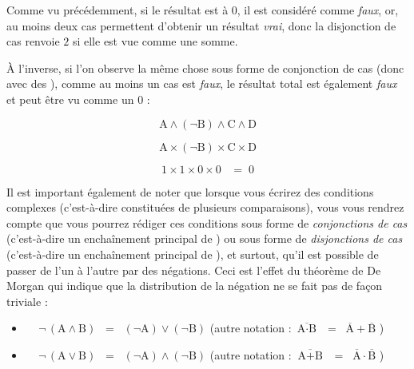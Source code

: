 \documentclass[11pt,a4paper]{article}
\begin{document}
Comme vu précédemment, si le résultat est à $ 0 $, il est considéré comme \textit{faux}, or, au moins deux cas permettent d'obtenir un résultat \textit{vrai}, donc la disjonction de cas renvoie $ 2 $ si elle est vue comme une somme.

\`A l'inverse, si l'on observe la même chose sous forme de conjonction de cas (donc avec des ), comme au moins un cas est \textit{faux}, le résultat total est également \textit{faux} et peut être vu comme un $ 0 $ :

\begin{table}[!ht]
  \centering
  \begin{minipage}{0.3\textwidth}
    \centering

\begin{equation*}
\text{A} \wedge ( \neg \text{B} ) \wedge \text{C} \wedge \text{D}
\end{equation*}

  \end{minipage}
  \hfillx
  \begin{minipage}{0.3\textwidth}
    \centering

\begin{equation*}
\text{A} \times ( \neg \text{B} ) \times \text{C} \times \text{D}
\end{equation*}

  \end{minipage}
  \hfillx
  \begin{minipage}{0.3\textwidth}
    \centering

\begin{equation*}
1 \times 1 \times 0 \times 0  \; \; \; = \; 0
\end{equation*}

  \end{minipage}
\end{table}


Il est important également de noter que lorsque vous écrirez des conditions complexes (c'est-à-dire constituées de plusieurs comparaisons), vous vous rendrez compte que vous pourrez rédiger ces conditions sous forme de \textit{conjonctions de cas} (c'est-à-dire un enchaînement principal de ) ou sous forme de \textit{disjonctions de cas} (c'est-à-dire un enchaînement principal de ), et surtout, qu'il est possible de passer de l'un à l'autre par des négations.
Ceci est l'effet du théorème de De Morgan qui indique que la distribution de la négation ne se fait pas de façon triviale :

\begin{itemize}[label=$\bullet$]
\item $ \; \; \; $  $ \neg \, ( \text{A} \wedge \text{B} ) \; \; = \; \;  ( \neg \text{A} ) \vee ( \neg \text{B} ) $  \hspace*{2cm}  (autre notation : $ \overline{\text{A} \cdot \text{B}} \; \; = \; \; \overline{\text{A}} + \overline{\text{B}} $ )
\item $ \; \; \; $  $ \neg \, ( \text{A} \vee \text{B} ) \; \; = \; \;  ( \neg \text{A} ) \wedge ( \neg \text{B} ) $  \hspace*{2cm}  (autre notation : $ \overline{\text{A} + \text{B}} \; \; = \; \; \overline{\text{A}} \cdot \overline{\text{B}} $ )
\end{itemize}
\end{document}
